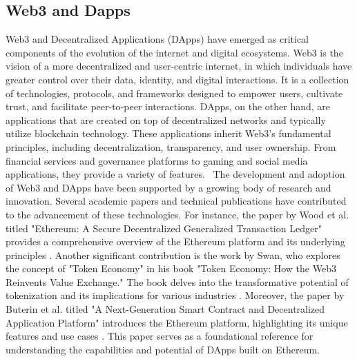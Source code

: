 \documentclass[../Main.tex]{subfiles}
\begin{document}
\subsection{Web3 and Dapps}
Web3 and Decentralized Applications (DApps) have emerged as critical components of the evolution of the internet and digital ecosystems. Web3 is the vision of a more decentralized and user-centric internet, in which individuals have greater control over their data, identity, and digital interactions. It is a collection of technologies, protocols, and frameworks designed to empower users, cultivate trust, and facilitate peer-to-peer interactions. DApps, on the other hand, are applications that are created on top of decentralized networks and typically utilize blockchain technology. These applications inherit Web3's fundamental principles, including decentralization, transparency, and user ownership. From financial services and governance platforms to gaming and social media applications, they provide a variety of features. 
The development and adoption of Web3 and DApps have been supported by a growing body of research and innovation. Several academic papers and technical publications have contributed to the advancement of these technologies. For instance, the paper by Wood et al. titled "Ethereum: A Secure Decentralized Generalized Transaction Ledger" provides a comprehensive overview of the Ethereum platform and its underlying principles \cite{Ethereum}.
Another significant contribution is the work by Swan, who explores the concept of "Token Economy" in his book "Token Economy: How the Web3 Reinvents Value Exchange." The book delves into the transformative potential of tokenization and its implications for various industries \cite{swan2018token}. Moreover, the paper by Buterin et al. titled "A Next-Generation Smart Contract and Decentralized Application Platform" introduces the Ethereum platform, highlighting its unique features and use cases \cite{buterin2014next}. This paper serves as a foundational reference for understanding the capabilities and potential of DApps built on Ethereum.
\end{document}

